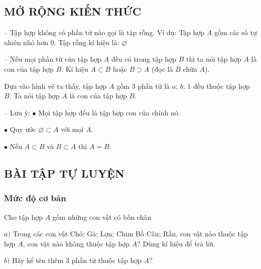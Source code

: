 \subsection{MỞ RỘNG KIẾN THỨC}
-- Tập hợp không có phần tử nào gọi là tập rỗng. Ví dụ: Tập hợp $A$ gồm các số tự nhiên nhỏ hơn $0$. Tập rỗng kí hiệu là: $\varnothing $

-- Nếu mọi phần tử của tập hợp $A$ đều có trong tập hợp $B$ thì ta nói tập hợp $A$ là con của tập hợp $B$. Kí hiệu $A\subset B$ hoặc $B\supset A$ (đọc là $B$ chứa $A$).

Dựa vào hình vẽ ta thấy, tập hợp $A$ gồm $3$ phần tử là $a$; $b$; 1 đều thuộc tập hợp $B$. Ta nói tập hợp $A$ là con của tập hợp $B$.

-- Lưu ý:
$\bullet$	Mọi tập hợp đểu là tập hợp con của chính nó.

$\bullet$	Quy ước $\varnothing \subset A$ với mọi $A$.

$\bullet$	Nếu $A\subset B$ và $B\subset A$ thì $A = B$.

\subsection{BÀI TẬP TỰ LUYỆN}

\subsubsection{Mức độ cơ bản}
\begin{bt}
	Cho tập hợp $A$ gồm những con vật có bốn chân
	
	$a)$ Trong các con vật Chó; Gà; Lợn; Chim Bồ Câu; Rắn, con vật nào thuộc tập hợp $A$, con vật nào không thuộc tập hợp $A$? Dùng kí hiệu để trả lời.
	
	$b)$ Hãy kể tên thêm $3$ phần tử thuộc tập hợp $A$?
\end{bt}

